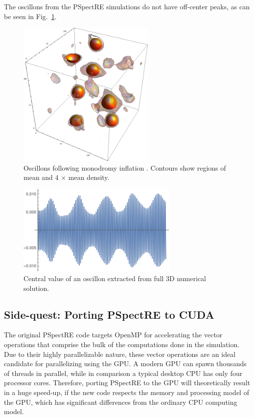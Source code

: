 \documentclass[11pt]{book}
\begin{document}
The oscillons from the PSpectRE simulations do not have off-center peaks, as can be seen in Fig.~\ref{oscillons}.

\begin{figure}
  \centering
  \includegraphics[width=0.6\textwidth]{plot/3dRE.png}
  \caption{Oscillons following monodromy inflation  \cite{Easther:2010qz}. Contours show regions of mean and 4 $\times$ mean density. }\label{oscillons}
\end{figure}

\begin{figure}
  \centering
  \includegraphics[width=0.7\textwidth]{plot/3Doscillon.png} 
    \caption{Central value of an oscillon extracted from full 3D numerical solution.}
  \label{raw}
\end{figure}

\subsection{Side-quest: Porting PSpectRE to CUDA}\label{porting}
The original PSpectRE code targets OpenMP for accelerating the vector operations that comprise the bulk of the computations done in the simulation. Due to their highly parallelizable nature, these vector operations are an ideal candidate for parallelizing using the GPU. A modern GPU can spawn thousands of threads in parallel, while in comparison a typical desktop CPU has only four processor cores. Therefore, porting PSpectRE to the GPU will theoretically result in a huge speed-up, if the new code respects the memory and processing model of the GPU, which has significant differences from the ordinary CPU computing model.
\end{document}
